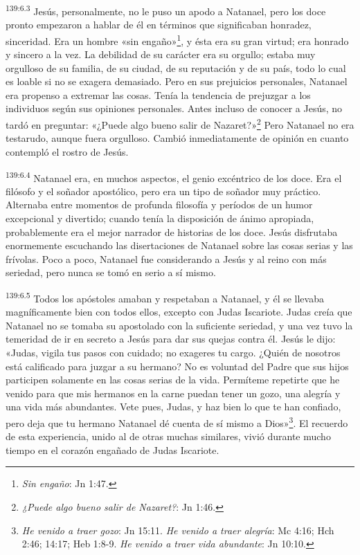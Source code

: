 \par 
\textsuperscript{139:6.3} Jesús, personalmente, no le puso un apodo a Natanael, pero los doce pronto empezaron a hablar de él en términos que significaban honradez, sinceridad. Era un hombre «sin engaño»\footnote{\textit{Sin engaño}: Jn 1:47.}, y ésta era su gran virtud; era honrado y sincero a la vez. La debilidad de su carácter era su orgullo; estaba muy orgulloso de su familia, de su ciudad, de su reputación y de su país, todo lo cual es loable si no se exagera demasiado. Pero en sus prejuicios personales, Natanael era propenso a extremar las cosas. Tenía la tendencia de prejuzgar a los individuos según sus opiniones personales. Antes incluso de conocer a Jesús, no tardó en preguntar: «¿Puede algo bueno salir de Nazaret?»\footnote{\textit{¿Puede algo bueno salir de Nazaret?}: Jn 1:46.} Pero Natanael no era testarudo, aunque fuera orgulloso. Cambió inmediatamente de opinión en cuanto contempló el rostro de Jesús.

\par 
\textsuperscript{139:6.4} Natanael era, en muchos aspectos, el genio excéntrico de los doce. Era el filósofo y el soñador apostólico, pero era un tipo de soñador muy práctico. Alternaba entre momentos de profunda filosofía y períodos de un humor excepcional y divertido; cuando tenía la disposición de ánimo apropiada, probablemente era el mejor narrador de historias de los doce. Jesús disfrutaba enormemente escuchando las disertaciones de Natanael sobre las cosas serias y las frívolas. Poco a poco, Natanael fue considerando a Jesús y al reino con más seriedad, pero nunca se tomó en serio a sí mismo.

\par 
\textsuperscript{139:6.5} Todos los apóstoles amaban y respetaban a Natanael, y él se llevaba magníficamente bien con todos ellos, excepto con Judas Iscariote. Judas creía que Natanael no se tomaba su apostolado con la suficiente seriedad, y una vez tuvo la temeridad de ir en secreto a Jesús para dar sus quejas contra él. Jesús le dijo: «Judas, vigila tus pasos con cuidado; no exageres tu cargo. ¿Quién de nosotros está calificado para juzgar a su hermano? No es voluntad del Padre que sus hijos participen solamente en las cosas serias de la vida. Permíteme repetirte que he venido para que mis hermanos en la carne puedan tener un gozo, una alegría y una vida más abundantes. Vete pues, Judas, y haz bien lo que te han confiado, pero deja que tu hermano Natanael dé cuenta de sí mismo a Dios»\footnote{\textit{He venido a traer gozo}: Jn 15:11. \textit{He venido a traer alegría}: Mc 4:16; Hch 2:46; 14:17; Heb 1:8-9. \textit{He venido a traer vida abundante}: Jn 10:10.}. El recuerdo de esta experiencia, unido al de otras muchas similares, vivió durante mucho tiempo en el corazón engañado de Judas Iscariote.

